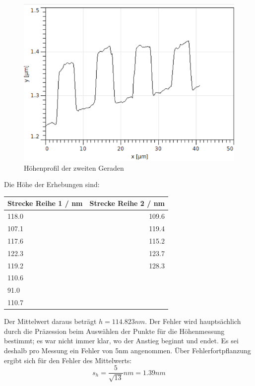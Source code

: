 \begin{figure}[h]
    \centering
    \includegraphics[scale = 0.5]{Bilder/zReihe2.png}
    \caption{Höhenprofil der zweiten Geraden}
    \label{bild:zReihe2}
\end{figure}

\newpage

Die Höhe der Erhebungen sind: 

\begin{center}
    \centering
    \begin{tabular}{l|r}
        Strecke Reihe 1 /  nm & Strecke Reihe 2 / nm \\
        \hline
        118.0 & 109.6 \\
        107.1 & 119.4 \\
        117.6 & 115.2 \\
        122.3 & 123.7 \\
        119.2 & 128.3 \\
        110.6 & \\
        91.0 & \\
        110.7 & \\
        
    \end{tabular}
\end{center}

Der Mittelwert daraus beträgt $h = 114.823 nm$.
Der Fehler wird hauptsächlich durch die Präzession beim Auswählen der Punkte für die Höhenmessung bestimmt; es war nicht immer klar, 
wo der Anstieg beginnt und endet. Es sei deshalb pro Messung ein Fehler von 5nm angenommen. Über Fehlerfortpflanzung ergibt sich für 
den Fehler des Mittelwerts: 
\begin{equation*}
    s_h = \frac{5}{\sqrt{13}} nm = 1.39 nm
\end{equation*}

